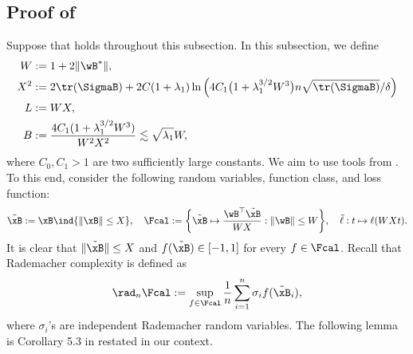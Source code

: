 \documentclass[11pt]{article}
\begin{document}
\subsection{Proof of \texorpdfstring{}{Theorem 3.2}}\label{sec:proof:gd:fast-upper-bound}
Suppose that  holds throughout this subsection.
In this subsection, we define
\begin{align*}
    W& := 1+2\|\wB^*\|,\\
X^2 &: = 2\tr(\SigmaB) + 2C(1+\lambda_1) \ln\Big(4C_1 \big(1+\lambda_1^{3/2} W^3\big) n \sqrt{\tr(\SigmaB)}/\delta\Big) \\
    L &:= WX,\\ 
    B &:= \frac{4C_1(1+\lambda_1^{3/2} W^3)}{W^2 X^2} \lesssim \sqrt{\lambda_1} W,
\end{align*}
where $C_0, C_1 > 1$ are two sufficiently large constants.
We aim to use tools from \citep{bartlett2005local}. To this end, consider the following random variables, function class, and loss function:
\begin{equation*}
    \tilde\xB := \xB\ind{\|\xB\|\le X},\quad 
    \Fcal := \bigg\{\tilde\xB\mapsto \frac{\wB^\top \tilde\xB}{WX}: \|\wB\| \le W \bigg\},\quad 
    \tilde\ell : t\mapsto  \ell(WX t).
\end{equation*}
It is clear that $\|\tilde\xB\|\le X$ and $f(\tilde\xB) \in [-1,1]$ for every $f\in\Fcal$.
Recall 
that Rademacher complexity is defined as 
\begin{align*}
    \rad_n \Fcal := \sup_{f \in \Fcal} \frac{1}{n}\sum_{i=1}^n \sigma_i f(\tilde\xB_i),
\end{align*}
where $\sigma_i$'s are independent Rademacher random variables.
The following lemma is Corollary 5.3 in \citep{bartlett2005local} restated in our context.
\end{document}
